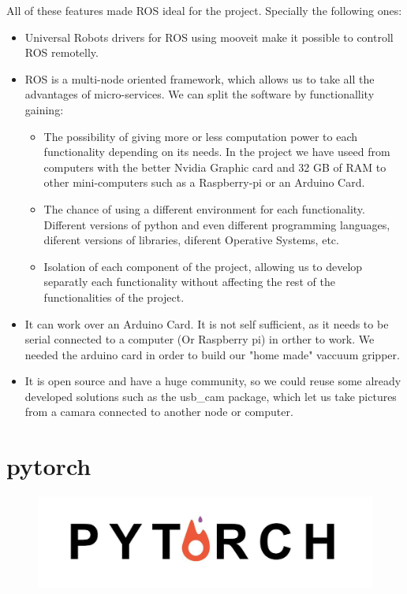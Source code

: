 		All of these features made ROS ideal for the project. Specially the following ones:
		\begin{itemize}
			\item[\textendash]Universal Robots drivers for ROS using mooveit make it possible to controll ROS remotelly.
			\item[\textendash] ROS is a multi-node oriented framework, which allows us to take all the advantages of micro-services. We can split the software by functionallity gaining:
			\begin{itemize}
				\item[\textendash]The possibility of giving more or less computation power to each functionality depending on its needs. In the project we have useed from  computers with the better Nvidia Graphic card and 32 GB of RAM to other mini-computers such as a Raspberry-pi or an Arduino Card.
				\item[\textendash]The chance of using a different environment for each functionality. Different versions of python and even different programming languages, diferent versions of libraries, diferent Operative Systems, etc.
				\item[\textendash]Isolation of each component of the project, allowing us to develop separatly each functionality without affecting the rest of the functionalities of the project.
			\end{itemize}
			\item[\textendash]It can work over an Arduino Card. It is not self sufficient, as it needs to be serial connected to a computer (Or Raspberry pi) in orther to work. We needed the arduino card in order to build our "home made" vaccuum gripper.
			\item[\textendash]It is open source and have a huge community, so we could reuse some already developed solutions such as the usb\_cam package, which let us take pictures from a camara connected to another node or computer.
			
		\end{itemize}


	\section{pytorch}
	
		\begin{figure}[h!]
			\centering
			\includegraphics[width=0.7\linewidth]{Images/logos/pytorch}
			\label{fig:pytorch}
		\end{figure}
	

